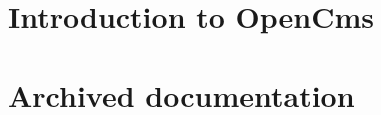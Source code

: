 \documentclass[a4paper,titlepage,12pt]{scrbook}
\begin{document}


\frontmatter
\tableofcontents
\mainmatter

\part{Introduction to OpenCms}








\part{Archived documentation}













\printindex  
\end{document}
